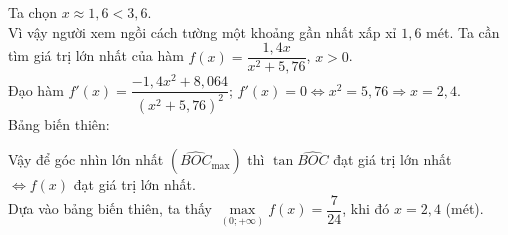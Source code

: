\begin{ex}
{\begin{itemchoice}
         Ta chọn $x\approx 1{,}6<3{,}6$.\\
         Vì vậy người xem ngồi cách tường một khoảng gần nhất xấp xỉ $1{,}6$ mét.
         \itemch Ta cần tìm giá trị lớn nhất của hàm $f(x)=\dfrac{1{,}4x}{x^2+5{,}76}$, $x>0$.\\
         Đạo hàm $f'(x)=\dfrac{-1{,}4x^2+8{,}064}{\left(x^2+5{,}76\right)^2}$; $f'(x)=0\Leftrightarrow x^2=5{,}76\Rightarrow x=2{,}4$.\\
         Bảng biến thiên:\\
         
         Vậy để góc nhìn lớn nhất $\left(\widehat{BOC}_{\max}\right)$ thì $\tan\widehat{BOC}$ đạt giá trị lớn nhất
         $\Leftrightarrow f(x)$ đạt giá trị lớn nhất.\\
         Dựa vào bảng biến thiên, ta thấy $\max\limits_{\left(0;+\infty \right)} f(x)=\dfrac{7}{24}$, khi đó $x=2{,}4$ (mét).
     \end{itemchoice}
 }
\end{ex}
